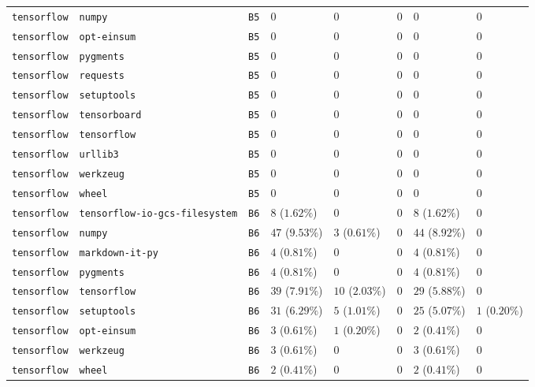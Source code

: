 \begin{table}
\begin{tabular}{llllllll}
\texttt{tensorflow} & \texttt{numpy} & \texttt{B5} & $0$ & $0$ & $0$ & $0$ & $0$ \\
\texttt{tensorflow} & \texttt{opt-einsum} & \texttt{B5} & $0$ & $0$ & $0$ & $0$ & $0$ \\
\texttt{tensorflow} & \texttt{pygments} & \texttt{B5} & $0$ & $0$ & $0$ & $0$ & $0$ \\
\texttt{tensorflow} & \texttt{requests} & \texttt{B5} & $0$ & $0$ & $0$ & $0$ & $0$ \\
\texttt{tensorflow} & \texttt{setuptools} & \texttt{B5} & $0$ & $0$ & $0$ & $0$ & $0$ \\
\texttt{tensorflow} & \texttt{tensorboard} & \texttt{B5} & $0$ & $0$ & $0$ & $0$ & $0$ \\
\texttt{tensorflow} & \texttt{tensorflow} & \texttt{B5} & $0$ & $0$ & $0$ & $0$ & $0$ \\
\texttt{tensorflow} & \texttt{urllib3} & \texttt{B5} & $0$ & $0$ & $0$ & $0$ & $0$ \\
\texttt{tensorflow} & \texttt{werkzeug} & \texttt{B5} & $0$ & $0$ & $0$ & $0$ & $0$ \\
\texttt{tensorflow} & \texttt{wheel} & \texttt{B5} & $0$ & $0$ & $0$ & $0$ & $0$ \\
\texttt{tensorflow} & \texttt{tensorflow-io-gcs-filesystem} & \texttt{B6} & $8$ ($1.62\%$) & $0$ & $0$ & $8$ ($1.62\%$) & $0$ \\
\texttt{tensorflow} & \texttt{numpy} & \texttt{B6} & $47$ ($9.53\%$) & $3$ ($0.61\%$) & $0$ & $44$ ($8.92\%$) & $0$ \\
\texttt{tensorflow} & \texttt{markdown-it-py} & \texttt{B6} & $4$ ($0.81\%$) & $0$ & $0$ & $4$ ($0.81\%$) & $0$ \\
\texttt{tensorflow} & \texttt{pygments} & \texttt{B6} & $4$ ($0.81\%$) & $0$ & $0$ & $4$ ($0.81\%$) & $0$ \\
\texttt{tensorflow} & \texttt{tensorflow} & \texttt{B6} & $39$ ($7.91\%$) & $10$ ($2.03\%$) & $0$ & $29$ ($5.88\%$) & $0$ \\
\texttt{tensorflow} & \texttt{setuptools} & \texttt{B6} & $31$ ($6.29\%$) & $5$ ($1.01\%$) & $0$ & $25$ ($5.07\%$) & $1$ ($0.20\%$) \\
\texttt{tensorflow} & \texttt{opt-einsum} & \texttt{B6} & $3$ ($0.61\%$) & $1$ ($0.20\%$) & $0$ & $2$ ($0.41\%$) & $0$ \\
\texttt{tensorflow} & \texttt{werkzeug} & \texttt{B6} & $3$ ($0.61\%$) & $0$ & $0$ & $3$ ($0.61\%$) & $0$ \\
\texttt{tensorflow} & \texttt{wheel} & \texttt{B6} & $2$ ($0.41\%$) & $0$ & $0$ & $2$ ($0.41\%$) & $0$ \\

\end{tabular}
\end{table}
